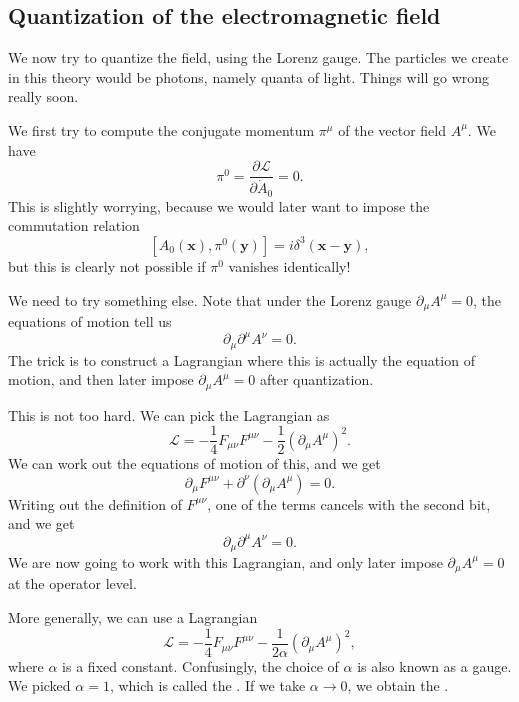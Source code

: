 \documentclass[a4paper]{article}
\begin{document}
\subsection{Quantization of the electromagnetic field}
We now try to quantize the field, using the Lorenz gauge. The particles we create in this theory would be photons, namely quanta of light. Things will go wrong really soon.

We first try to compute the conjugate momentum $\pi^\mu$ of the vector field $A^\mu$. We have
\[
  \pi^0 = \frac{\partial \mathcal{L}}{\partial \dot{A}_0} = 0.
\]
This is slightly worrying, because we would later want to impose the commutation relation
\[
  [A_0(\mathbf{x}), \pi^0(\mathbf{y})] = i \delta^3(\mathbf{x} - \mathbf{y}),
\]
but this is clearly not possible if $\pi^0$ vanishes identically!

We need to try something else. Note that under the Lorenz gauge $\partial_\mu A^\mu = 0$, the equations of motion tell us
\[
  \partial_\mu \partial^\mu A^\nu = 0.
\]
The trick is to construct a Lagrangian where this is actually the equation of motion, and then later impose $\partial_\mu A^\mu = 0$ after quantization.

This is not too hard. We can pick the Lagrangian as
\[
  \mathcal{L} = -\frac{1}{4} F_{\mu\nu}F^{\mu\nu} - \frac{1}{2}(\partial_\mu A^\mu)^2.
\]
We can work out the equations of motion of this, and we get
\[
  \partial_\mu F^{\mu\nu} + \partial^\nu(\partial_\mu A^\mu) = 0.
\]
Writing out the definition of $F^{\mu\nu}$, one of the terms cancels with the second bit, and we get
\[
  \partial_\mu \partial^\mu A^\nu = 0.
\]
We are now going to work with this Lagrangian, and only later impose $\partial_\mu A^\mu = 0$ at the operator level.

More generally, we can use a Lagrangian
\[
  \mathcal{L} =- \frac{1}{4}F_{\mu\nu}F^{\mu\nu} - \frac{1}{2\alpha} (\partial_\mu A^\mu)^2,
\]
where $\alpha$ is a fixed constant. Confusingly, the choice of $\alpha$ is also known as a gauge. We picked $\alpha = 1$, which is called the . If we take $\alpha \to 0$, we obtain the .
\end{document}

